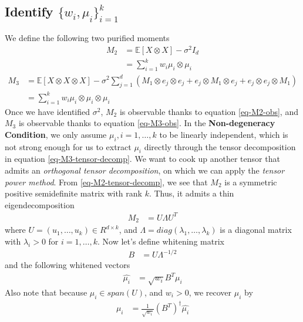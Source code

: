 \documentclass{article}
\begin{document}
\subsection{Identify $\{w_i,\mu_i\}_{i=1}^k$}
We define the following two purified moments
\begin{align}
M_2&=\mathbb{E}[X\otimes X] - \sigma^2 I_d
\label{eq-M2-obs}
\\
&=\sum_{i=1}^k w_i \mu_i\otimes \mu_i
\label{eq-M2-tensor-decomp}
\end{align}
\begin{align}
M_3&=\mathbb{E}[X\otimes X\otimes X] - \sigma^2\sum_{j=1}^d  (M_1 \otimes e_j \otimes e_j + e_j \otimes M_1 \otimes e_j + e_j \otimes e_j \otimes M_1)
\label{eq-M3-obs}
\\
&=\sum_{i=1}^k w_i \mu_i\otimes \mu_i \otimes \mu_i
\label{eq-M3-tensor-decomp}
\end{align}
Once we have identified $\sigma^2$, $M_2$ is observable thanks to equation \eqref{eq-M2-obs}, and $M_3$ is observable thanks to equation \eqref{eq-M3-obs}. In the \textbf{Non-degeneracy Condition}, we only assume $\mu_i,i=1,\ldots,k$ to be linearly independent, which is not strong enough for us to extract $\mu_i$ directly through the tensor decomposition in equation \eqref{eq-M3-tensor-decomp}. We want to cook up another tensor that admits an \textit{orthogonal tensor decomposition}, on which we can apply the \textit{tensor power method}. From \eqref{eq-M2-tensor-decomp}, we see that $M_2$ is a symmetric positive semidefinite matrix with rank $k$. Thus, it admits a thin eigendecomposition
\begin{align}
M_2 &= U\Lambda U^{T}
\label{eq-M2-thin-eigendecomp}
\end{align}
where $U=(u_1,\ldots,u_k)\in R^{d\times k}$, and $\Lambda=diag(\lambda_1,\ldots,\lambda_k)$ is a diagonal matrix with $\lambda_i>0$ for $i=1,\ldots, k$.
Now let's define whitening matrix
\begin{align}
B&=U\Lambda^{-1/2}
\label{eq-whiten-matrix}
\end{align}
and the following whitened vectors
\begin{align}
\widehat{\mu_i}&=\sqrt{w_i}B^{T}\mu_i
\label{eq-whiten-vector}
\end{align}
Also note that because $\mu_i\in span(U)$, and $w_i>0$, we recover $\mu_i$ by
\begin{align}
\mu_i&=\frac{1}{\sqrt{w_i}}(B^{T})^{\dagger}\widehat{\mu_i}
\label{eq-whiten-vector-recover}
\end{align}
\end{document}
